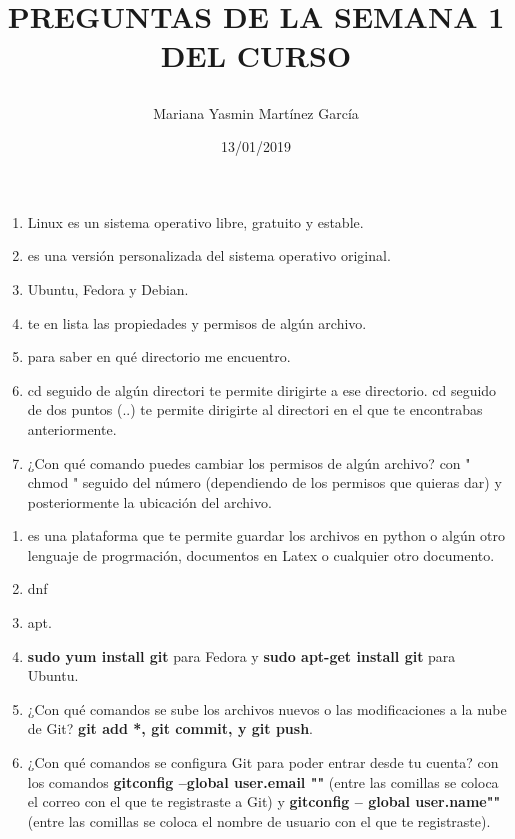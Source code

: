 \documentclass[letterpaper, 12pt, twoside]{article}
\title{\Huge\item\color{red}\textbf {PREGUNTAS DE LA SEMANA 1 DEL CURSO}}
\author{Mariana Yasmin Martínez García}
\date{13/01/2019}
\begin{document}
	\maketitle
	
	\newpage
	\title{\Large\color{red}}
	\begin{enumerate}
		\item{} Linux es un sistema operativo libre, gratuito y estable.
		\item{} es una versión personalizada del sistema operativo original.
		\item{} Ubuntu, Fedora y Debian.
		\item{} te en lista las propiedades y permisos de algún archivo.
		\item{}para saber en qué directorio me encuentro.
		\item{} cd seguido de algún directori te permite dirigirte a ese directorio. cd seguido de dos puntos (..) te permite dirigirte al directori en el que te encontrabas anteriormente.
		\item{\Large ¿Con qué comando puedes cambiar los permisos de algún archivo?} con " chmod " seguido del número (dependiendo de los permisos que quieras dar) y posteriormente la ubicación del archivo.
	\end{enumerate}

    \title{\Large\color{red}} 
    \begin{enumerate}
        \item{} es una plataforma que te permite guardar los archivos en python o algún otro lenguaje de progrmación, documentos en Latex o cualquier otro documento.
        \item{} dnf
         \item{} apt.
          \item{} \textbf{sudo yum install git} para Fedora y \textbf{sudo apt-get install git} para Ubuntu.
           \item{\Large ¿Con qué comandos se sube los archivos nuevos o las modificaciones a la nube de Git?} \textbf{git add *, git commit, y git push}.
            \item{\Large ¿Con qué comandos se configura Git para poder entrar desde tu cuenta?} con los comandos \textbf{gitconfig --global user.email ""} (entre las comillas se coloca el correo con el que te registraste a Git) y \textbf{gitconfig -- global user.name""} (entre las comillas se coloca el nombre de usuario con el que te registraste).
          
    \end{enumerate}
\end{document}
